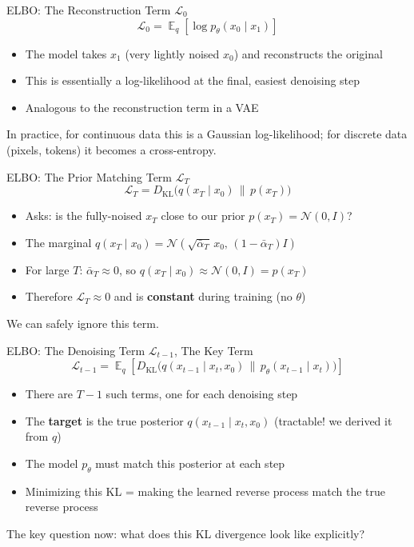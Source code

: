 \documentclass[10pt, aspectratio=169]{beamer}
\DeclareMathOperator*{\E}{\mathbb{E}}
\newcommand{\KL}{D_{\mathrm{KL}}}
\begin{document}
\begin{frame}{ELBO: The Reconstruction Term $\mathcal{L}_0$}
  \[
    \mathcal{L}_0 = \E_q\!\left[\log p_\theta(x_0 \mid x_1)\right]
  \]
  \begin{itemize}
    \item The model takes $x_1$ (very lightly noised $x_0$) and reconstructs the original
    \item This is essentially a log-likelihood at the final, easiest denoising step
    \item Analogous to the reconstruction term in a VAE
  \end{itemize}
  In practice, for continuous data this is a Gaussian log-likelihood;
  for discrete data (pixels, tokens) it becomes a cross-entropy.
\end{frame}

\begin{frame}{ELBO: The Prior Matching Term $\mathcal{L}_T$}
  \[
    \mathcal{L}_T = \KL\!\bigl(q(x_T\mid x_0)\,\|\,p(x_T)\bigr)
  \]
  \begin{itemize}
    \item Asks: is the fully-noised $x_T$ close to our prior $p(x_T) = \mathcal{N}(0,I)$?
    \item The marginal $q(x_T\mid x_0) = \mathcal{N}(\sqrt{\bar\alpha_T}\,x_0,\,(1-\bar\alpha_T)I)$
    \item For large $T$: $\bar\alpha_T \approx 0$, so $q(x_T\mid x_0) \approx \mathcal{N}(0,I) = p(x_T)$
    \item Therefore $\mathcal{L}_T \approx 0$ and is \textbf{constant} during training (no $\theta$)
  \end{itemize}
  We can safely ignore this term.
\end{frame}

\begin{frame}{ELBO: The Denoising Term $\mathcal{L}_{t-1}$, The Key Term}
  \[
    \mathcal{L}_{t-1} = \E_q\!\left[\KL\!\bigl(q(x_{t-1}\mid x_t,x_0)\,\|\,p_\theta(x_{t-1}\mid x_t)\bigr)\right]
  \]
  \begin{itemize}
    \item There are $T-1$ such terms, one for each denoising step
    \item The \textbf{target} is the true posterior $q(x_{t-1}\mid x_t, x_0)$ (tractable! we derived it from $q$)
    \item The model $p_\theta$ must match this posterior at each step
    \item Minimizing this KL = making the learned reverse process match the true reverse process
  \end{itemize}
  The key question now: what does this KL divergence look like explicitly?
\end{frame}
\end{document}
